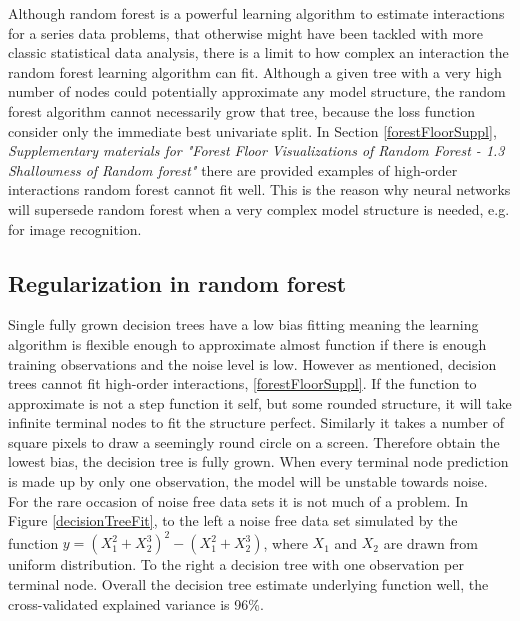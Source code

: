 Although random forest is a powerful learning algorithm to estimate interactions for a series data problems, that otherwise might have been tackled with more classic statistical data analysis, there is a limit to how complex an interaction the random forest learning algorithm can fit. Although a given tree with a very high number of nodes could potentially approximate any model structure, the random forest algorithm cannot necessarily grow that tree, because the loss function consider only the immediate best univariate split. In Section \ref{forestFloorSuppl}, \textit{Supplementary materials for "Forest Floor Visualizations of Random Forest - 1.3 Shallowness of Random forest"} there are provided examples of high-order interactions random forest cannot fit well. This is the reason why neural networks will supersede random forest when a very complex model structure is needed, e.g. for image recognition.

\subsection{Regularization in random forest}
Single fully grown decision trees have a low bias fitting meaning the learning algorithm is flexible enough to approximate almost function if there is enough training observations and the noise level is low. However as mentioned, decision trees cannot fit high-order interactions, \ref{forestFloorSuppl}. If the function to approximate is not a step function it self, but some rounded structure, it will take infinite terminal nodes to fit the structure perfect. Similarly it takes a number of square pixels to draw a seemingly round circle on a screen. Therefore obtain the lowest bias, the decision tree is fully grown. When every terminal node prediction is made up by only one observation, the model will be unstable towards noise. For the rare occasion of noise free data sets it is not much of a problem. In Figure \ref{decisionTreeFit}, to the left a noise free data set simulated by the function $y=(X_1^2 + X_2^3)^2 - (X_1^2 + X_2^3)$, where $X_1$ and $X_2$ are drawn from uniform distribution. To the right a decision tree with one observation per terminal node. Overall the decision tree estimate underlying function well, the cross-validated explained variance is 96\%.


